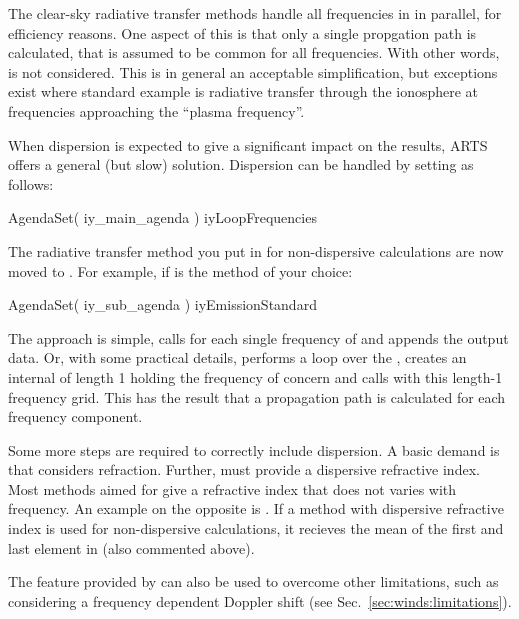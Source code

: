 The clear-sky radiative transfer methods handle all frequencies in
 in parallel, for efficiency reasons. One aspect of this is
that only a single propgation path is calculated, that is assumed to be common
for all frequencies. With other words,  is not
considered. This is in general an acceptable simplification, but
exceptions exist where standard example is radiative transfer through the
ionosphere at frequencies approaching the ``plasma frequency''. 

When dispersion is expected to give a significant impact on the results, ARTS
offers a general (but slow) solution. Dispersion can be handled by setting
 as follows:
\begin{code}
AgendaSet( iy_main_agenda ){
  iyLoopFrequencies
}
\end{code}
The radiative transfer method you put in  for
non-dispersive calculations are now moved to . For
example, if  is the method of your choice:
\begin{code}
AgendaSet( iy_sub_agenda ){
  iyEmissionStandard
}
\end{code}
The approach is simple,  calls
 for each single frequency of 
and appends the output data. Or, with some practical details,
 performs a loop over the ,
creates an internal  of length 1 holding the frequency of
concern and calls  with this length-1 frequency
grid. This has the result that a propagation path is calculated for each
frequency component.

Some more steps are required to correctly include dispersion. A basic demand is
that  considers refraction. Further,
 must provide a dispersive refractive index. Most
methods aimed for  give a refractive index that
does not varies with frequency. An example on the opposite is
. If a method with dispersive refractive
index is used for non-dispersive calculations, it recieves the mean of the
first and last element in  (also commented above).

The feature provided by  can also be used to
overcome other limitations, such as considering a frequency dependent Doppler
shift (see Sec.~\ref{sec:winds:limitations}).






